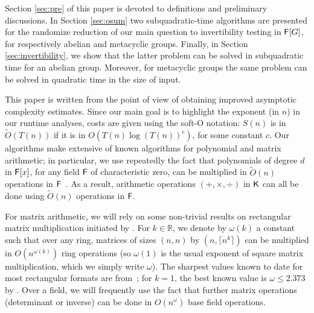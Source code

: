 Section \ref{sec:pre} of this paper is devoted to definitions and
preliminary discussions.  In Section \ref{sec:osum} two subquadratic-time
algorithms are presented for the randomize reduction of our main question
to invertibility testing in ${\mathsf{F}}[G]$, for respectively abelian and
metacyclic groups.  Finally, in Section \ref{sec:invertibility}, we show
that the latter problem can be solved in subquadratic time for an abelian group.
Moreover, for metacyclic groups the same problem can be solved in quadratic time 
in the size of input.

This paper is written from the point of view of obtaining improved
asymptotic complexity estimates. Since our main goal is to highlight the
exponent (in $n$) in our runtime analyses, costs are given using the soft-O
notation: $S(n)$ is in $\tilde{O}(T(n))$ if it is in
$O(T(n) \log(T(n))^c)$, for some constant $c$. Our algorithms make
extensive of known algorithms for polynomial and matrix arithmetic; in
particular, we use repeatedly the fact that polynomials of degree $d$ in
${\mathsf{F}}[x]$, for any field ${\mathsf{F}}$ of characteristic zero, can be multiplied in
$\tilde{O}(n)$ operations in ${\mathsf{F}}$~\cite{ScSt71}. As a result, arithmetic 
operations $(+,\times,\div)$ in ${\mathsf{K}}$ can all be done using $\tilde{O}(n)$ 
operations in ${\mathsf{F}}$.

For matrix arithmetic, we will rely on some non-trivial results on
rectangular matrix multiplication initiated by . For $k \in
\mathbb{R}$, we denote by $\omega(k)$ a constant such that over any
ring, matrices of sizes $(n,n)$ by $(n,\lceil n^k \rceil)$ can be
multiplied in $O(n^{\omega(k)})$ ring operations (so $\omega(1)$ is
the usual exponent of square matrix multiplication, which we simply
write $\omega$).  The sharpest values known to date for most
rectangular formats are from~\cite{LeGall}; for $k=1$, the best known
value is $\omega \le 2.373$ by . Over a field, we will
frequently use the fact that further matrix operations (determinant or
inverse) can be done in $O(n^\omega)$ base field operations.


